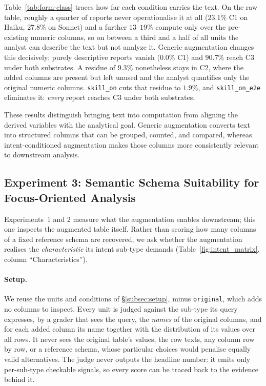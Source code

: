 Table~\ref{tab:form-class} traces how far each condition carries the text. On the raw table, roughly a quarter of reports never operationalise it at all ($23.1\%$ C1 on Haiku, $27.8\%$ on Sonnet) and a further $13$--$19\%$ compute only over the pre-existing numeric columns, so on between a third and a half of all units the analyst can describe the text but not analyze it. Generic augmentation changes this decisively: purely descriptive reports vanish ($0.0\%$ C1) and $90.7\%$ reach C3 under both substrates. A residue of $9.3\%$ nonetheless stays in C2, where the added columns are present but left unused and the analyst quantifies only the original numeric columns. \texttt{skill\_on} cuts that residue to $1.9\%$, and \texttt{skill\_on\_e2e} eliminates it: \emph{every} report reaches C3 under both substrates.

These results distinguish bringing text into computation from aligning the derived variables with the analytical goal. Generic augmentation converts text into structured columns that can be grouped, counted, and compared, whereas intent-conditioned augmentation makes those columns more consistently relevant to downstream analysis.

\subsection{Experiment 3: Semantic Schema Suitability for Focus-Oriented Analysis}
\label{subsec:exp-adherence}

Experiments~1 and 2 measure what the augmentation enables downstream; this one inspects the augmented table itself. Rather than scoring how many columns of a fixed reference schema are recovered, we ask whether the augmentation realises the \emph{characteristic} its intent sub-type demands (Table~\ref{fig:intent_matrix}, column ``Characteristics'').

\paragraph{Setup.} We reuse the units and conditions of \S\ref{subsec:setup}, minus \texttt{original}, which adds no columns to inspect. Every unit is judged against the sub-type its query expresses, by a grader that sees the query, the \emph{names} of the original columns, and for each added column its name together with the distribution of its values over all rows. It never sees the original table's values, the row texts, any column row by row, or a reference schema, whose particular choices would penalise equally valid alternatives. The judge never outputs the headline number: it emits only per-sub-type checkable signals, so every score can be traced back to the evidence behind it.

